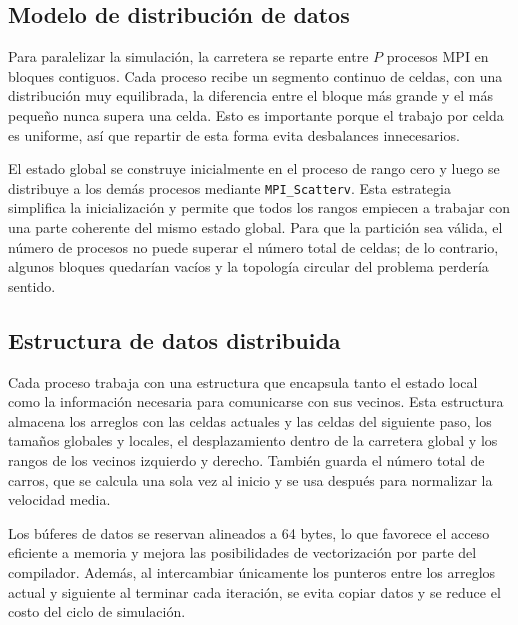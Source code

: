 \subsection{Modelo de distribución de datos}

Para paralelizar la simulación, la carretera se reparte entre $P$ procesos MPI en bloques contiguos. Cada proceso recibe un segmento continuo de celdas, con una distribución muy equilibrada, la diferencia entre el bloque más grande y el más pequeño nunca supera una celda. Esto es importante porque el trabajo por celda es uniforme, así que repartir de esta forma evita desbalances innecesarios.

El estado global se construye inicialmente en el proceso de rango cero y luego se distribuye a los demás procesos mediante \texttt{MPI\_Scatterv}. Esta estrategia simplifica la inicialización y permite que todos los rangos empiecen a trabajar con una parte coherente del mismo estado global. Para que la partición sea válida, el número de procesos no puede superar el número total de celdas; de lo contrario, algunos bloques quedarían vacíos y la topología circular del problema perdería sentido.

\subsection{Estructura de datos distribuida}

Cada proceso trabaja con una estructura que encapsula tanto el estado local como la información necesaria para comunicarse con sus vecinos. Esta estructura almacena los arreglos con las celdas actuales y las celdas del siguiente paso, los tamaños globales y locales, el desplazamiento dentro de la carretera global y los rangos de los vecinos izquierdo y derecho. También guarda el número total de carros, que se calcula una sola vez al inicio y se usa después para normalizar la velocidad media.

Los búferes de datos se reservan alineados a 64 bytes, lo que favorece el acceso eficiente a memoria y mejora las posibilidades de vectorización por parte del compilador. Además, al intercambiar únicamente los punteros entre los arreglos actual y siguiente al terminar cada iteración, se evita copiar datos y se reduce el costo del ciclo de simulación.


